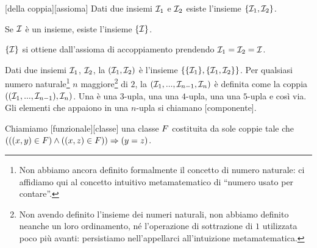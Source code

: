 \begin{Axiom}
	[della coppia][assioma] Dati due insiemi $\mathcal{I}_1$ e $\mathcal{I}_2$ esiste l'insieme $\lbrace \mathcal{I}_1, \mathcal{I}_2 \rbrace$.
\end{Axiom}
\begin{Theorem}
	Se $\mathcal{I}$ \`e un insieme, esiste l'insieme $\lbrace \mathcal{I} \rbrace$.
\end{Theorem}
\Proof $\lbrace \mathcal{I} \rbrace$ si ottiene dall'assioma di accoppiamento prendendo $\mathcal{I}_1 = \mathcal{I}_2 = \mathcal{I}$. \EndProof
\begin{Definition}
	Dati due insiemi $\mathcal{I}_1$, $\mathcal{I}_2$, la  $(\mathcal{I}_1,\mathcal{I}_2)$ \`e l'insieme $\lbrace \lbrace \mathcal{I}_1 \rbrace, \lbrace \mathcal{I}_1, \mathcal{I}_2 \rbrace \rbrace$. Per qualsiasi numero naturale\footnote{Non abbiamo ancora definito formalmente il concetto di numero naturale: ci affidiamo qui al concetto intuitivo metamatematico di ``numero usato per contare''.} $n$ maggiore\footnote{Non avendo definito l'insieme dei numeri naturali, non abbiamo definito neanche un loro ordinamento, n\'e l'operazione di sottrazione di $1$ utilizzata poco pi\`u avanti: persistiamo nell'appellarci all'intuizione metamatematica.} di $2$, la  $(\mathcal{I}_1, ..., \mathcal{I}_{n - 1}, \mathcal{I}_n)$ \`e definita come la coppia $((\mathcal{I}_1, ..., \mathcal{I}_{n - 1}), \mathcal{I}_n)$. Una  \`e una $3$-upla, una  una $4$-upla, una  una $5$-upla e cos\`i via. Gli elementi che appaiono in una $n$-upla si chiamano [componente].
\end{Definition}
\begin{Definition}
	Chiamiamo [funzionale][classe] una classe $F$ costituita da sole coppie tale che $\left ( \left ( (x,y) \in F \right ) \wedge \left ( (x,z) \in F \right ) \right ) \Rightarrow \left ( y = z \right )$.
\end{Definition}
